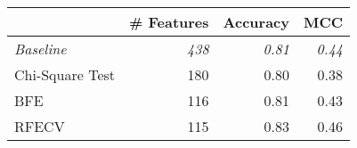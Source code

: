 \begin{tabular}{lrrr}
\toprule
        & \textbf{\# Features}   & \textbf{Accuracy} & \textbf{MCC}  \\
\midrule
\textit{Baseline}               & \textit{438}           & \textit{0.81}     & \textit{0.44} \\
Chi-Square Test                 & 180                    & 0.80              & 0.38          \\
BFE   & 116                    &  0.81            & 0.43          \\
RFECV & 115              & 0.83    & 0.46          \\
\bottomrule
\end{tabular}
